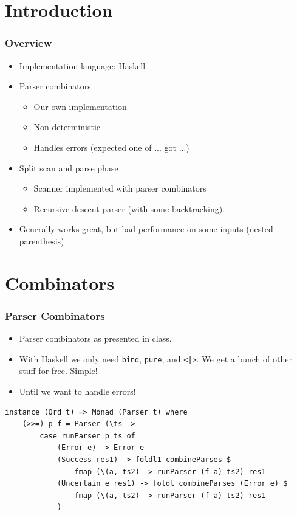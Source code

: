 \documentclass{beamer}
\begin{document}
\section{Introduction}
\begin{frame}
\frametitle{Overview}
\begin{itemize}
\item Implementation language: Haskell
\item Parser combinators
    \begin{itemize}
    \item Our own implementation
    \item Non-deterministic
    \item Handles errors (expected one of ... got ...)
    \end{itemize}
\item Split scan and parse phase
    \begin{itemize}
    \item Scanner implemented with parser combinators
    \item Recursive descent parser (with some backtracking).
    \end{itemize}
\item Generally works great, but bad performance on some inputs (nested parenthesis)
\end{itemize}
\end{frame}

\section{Combinators}
\begin{frame}[fragile]

\frametitle{Parser Combinators}

\begin{itemize}
\item Parser combinators as presented in class.
\item With Haskell we only need \lstinline{bind}, \lstinline{pure}, and \lstinline{<|>}. We get a bunch of other stuff for free. Simple!
\item Until we want to handle errors!
\end{itemize}

\begin{lstlisting}
instance (Ord t) => Monad (Parser t) where
    (>>=) p f = Parser (\ts -> 
        case runParser p ts of
            (Error e) -> Error e
            (Success res1) -> foldl1 combineParses $
                fmap (\(a, ts2) -> runParser (f a) ts2) res1
            (Uncertain e res1) -> foldl combineParses (Error e) $
                fmap (\(a, ts2) -> runParser (f a) ts2) res1
            )
\end{lstlisting}

\end{frame}
\end{document}
